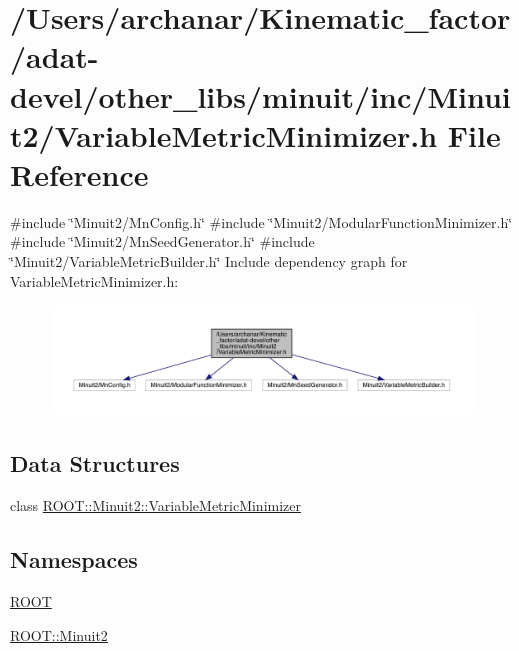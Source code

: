 \hypertarget{adat-devel_2other__libs_2minuit_2inc_2Minuit2_2VariableMetricMinimizer_8h}{}\section{/\+Users/archanar/\+Kinematic\+\_\+factor/adat-\/devel/other\+\_\+libs/minuit/inc/\+Minuit2/\+Variable\+Metric\+Minimizer.h File Reference}
\label{adat-devel_2other__libs_2minuit_2inc_2Minuit2_2VariableMetricMinimizer_8h}
{\ttfamily \#include \char`\"{}Minuit2/\+Mn\+Config.\+h\char`\"{}}\newline
{\ttfamily \#include \char`\"{}Minuit2/\+Modular\+Function\+Minimizer.\+h\char`\"{}}\newline
{\ttfamily \#include \char`\"{}Minuit2/\+Mn\+Seed\+Generator.\+h\char`\"{}}\newline
{\ttfamily \#include \char`\"{}Minuit2/\+Variable\+Metric\+Builder.\+h\char`\"{}}\newline
Include dependency graph for Variable\+Metric\+Minimizer.\+h\+:
\nopagebreak
\begin{figure}[H]
\begin{center}
\leavevmode
\includegraphics[width=350pt]{da/d45/adat-devel_2other__libs_2minuit_2inc_2Minuit2_2VariableMetricMinimizer_8h__incl}
\end{center}
\end{figure}
\subsection*{Data Structures}
\begin{DoxyCompactItemize}
\item 
class \mbox{\hyperlink{classROOT_1_1Minuit2_1_1VariableMetricMinimizer}{R\+O\+O\+T\+::\+Minuit2\+::\+Variable\+Metric\+Minimizer}}
\end{DoxyCompactItemize}
\subsection*{Namespaces}
\begin{DoxyCompactItemize}
\item 
 \mbox{\hyperlink{namespaceROOT}{R\+O\+OT}}
\item 
 \mbox{\hyperlink{namespaceROOT_1_1Minuit2}{R\+O\+O\+T\+::\+Minuit2}}
\end{DoxyCompactItemize}
